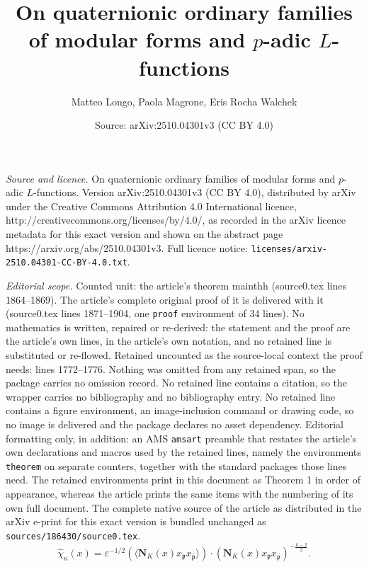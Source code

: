 \documentclass[10pt,a4paper]{amsart}
\title{On quaternionic ordinary families of modular forms and $p$-adic $L$-functions}
\author{Matteo Longo, Paola Magrone, Eris Rocha Walchek}
\date{Source: arXiv:2510.04301v3 (CC BY 4.0)}
\begin{document}
\maketitle

\noindent\emph{Source and licence.} On quaternionic ordinary families of modular forms and $p$-adic $L$-functions. Version arXiv:2510.04301v3 (CC BY 4.0), distributed by arXiv under the Creative Commons Attribution 4.0 International licence, http://creativecommons.org/licenses/by/4.0/, as recorded in the arXiv licence metadata for this exact version and shown on the abstract page https://arxiv.org/abs/2510.04301v3. Full licence notice: \texttt{licenses/arxiv-2510.04301-CC-BY-4.0.txt}.\par\smallskip

\noindent\textit{Editorial scope.} Counted unit: the article's theorem mainthh (source0.tex lines 1864--1869). The article's complete original proof of it is delivered with it (source0.tex lines 1871--1904, one \texttt{proof} environment of 34 lines). No mathematics is written, repaired or re-derived: the statement and the proof are the article's own lines, in the article's own notation, and no retained line is substituted or re-flowed.  Retained uncounted as the source-local context the proof needs: lines 1772--1776.  Nothing was omitted from any retained span, so the package carries no omission record.  No retained line contains a citation, so the wrapper carries no bibliography and no bibliography entry.  No retained line contains a figure environment, an image-inclusion command or drawing code, so no image is delivered and the package declares no asset dependency.  Editorial formatting only, in addition: an AMS \texttt{amsart} preamble that restates the article's own declarations and macros used by the retained lines, namely the environments \texttt{theorem} on separate counters, together with the standard packages those lines need.  The retained environments print in this document as Theorem 1 in order of appearance, whereas the article prints the same items with the numbering of its own full document.  The complete native source of the article as distributed in the arXiv e-print for this exact version is bundled unchanged as \texttt{sources/186430/source0.tex}.
\begin{equation}\label{chi_k}
\hat\chi_\kappa (x)= 
\varepsilon ^{-1/2}(\langle \mathbf{N}_K(x)x_\mathfrak{p}  x_{\bar{\mathfrak{p}}}\rangle)\cdot
(\mathbf{N}_K(x)x_\mathfrak{p} x_{\bar{\mathfrak{p}}})^{-\frac{k -2}{2}}.
\end{equation}
\end{document}

